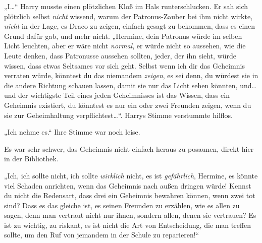 „I…“ Harry musste einen plötzlichen Kloß im Hals runterschlucken. Er sah sich plötzlich selbst \emph{nicht} wissend, warum der Patronus-Zauber bei ihm nicht wirkte, \emph{nicht} in der Lage, es Draco zu zeigen, einfach gesagt zu bekommen, dass es einen Grund dafür gab, und mehr nicht. „Hermine, dein Patronus würde im selben Licht leuchten, aber er wäre nicht \emph{normal}, er würde nicht so aussehen, wie die Leute denken, dass Patronusse aussehen sollten, jeder, der ihn sieht, würde wissen, dass etwas Seltsames vor sich geht. Selbst wenn ich dir das Geheimnis verraten würde, könntest du das niemandem \emph{zeigen}, es sei denn, du würdest sie in die andere Richtung schauen lassen, damit sie nur das Licht sehen könnten, und…und der wichtigste Teil eines jeden Geheimnisses ist das Wissen, dass ein Geheimnis existiert, du könntest es nur ein oder zwei Freunden zeigen, wenn du sie zur Geheimhaltung verpflichtest…“. Harrys Stimme verstummte hilflos.

„Ich nehme es.“ Ihre Stimme war noch leise.

Es war sehr schwer, das Geheimnis nicht einfach heraus zu posaunen, direkt hier in der Bibliothek.

„Ich, ich sollte nicht, ich sollte \emph{wirklich} nicht, es ist \emph{gefährlich}, Hermine, es könnte viel Schaden anrichten, wenn das Geheimnis nach außen dringen würde! Kennst du nicht die Redensart, dass drei ein Geheimnis bewahren können, wenn zwei tot sind? Dass es das gleiche ist, es seinen Freunden zu erzählen, wie es allen zu sagen, denn man vertraut nicht nur ihnen, sondern allen, denen sie vertrauen? Es ist zu wichtig, zu riskant, es ist nicht die Art von Entscheidung, die man treffen sollte, um den Ruf von jemandem in der Schule zu reparieren!“

